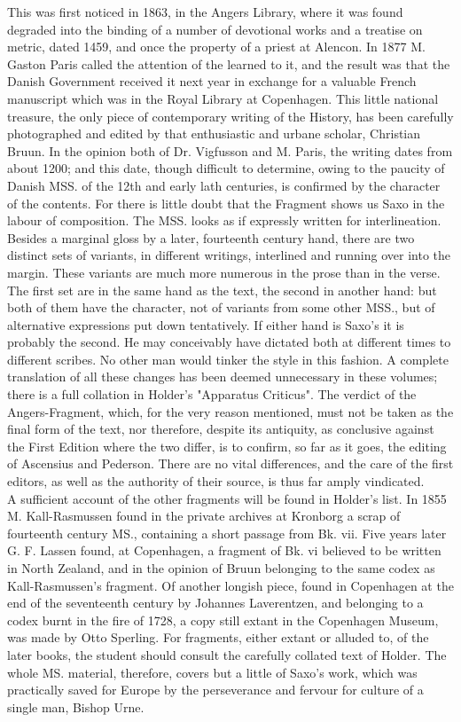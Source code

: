 \documentclass[10pt,a4paper]{report}
\begin{document}
This was first noticed in 1863, in the Angers Library, where it was found degraded into the binding of a number of devotional works and a treatise on metric, dated 1459, and once the property of a priest at Alencon. In 1877 M. Gaston Paris called the attention of the learned to it, and the result was that the Danish Government received it next year in exchange for a valuable French manuscript which was in the Royal Library at Copenhagen. This little national treasure, the only piece of contemporary writing of the History, has been carefully photographed and edited by that enthusiastic and urbane scholar, Christian Bruun. In the opinion both of Dr. Vigfusson and M. Paris, the writing dates from about 1200; and this date, though difficult to determine, owing to the paucity of Danish MSS. of the 12th and early lath centuries, is confirmed by the character of the contents. For there is little doubt that the Fragment shows us Saxo in the labour of composition. The MSS. looks as if expressly written for interlineation. Besides a marginal gloss by a later, fourteenth century hand, there are two distinct sets of variants, in different writings, interlined and running over into the margin. These variants are much more numerous in the prose than in the verse. The first set are in the same hand as the text, the second in another hand: but both of them have the character, not of variants from some other MSS., but of alternative expressions put down tentatively. If either hand is Saxo's it is probably the second. He may conceivably have dictated both at different times to different scribes. No other man would tinker the style in this fashion. A complete translation of all these changes has been deemed unnecessary in these volumes; there is a full collation in Holder's "Apparatus Criticus". The verdict of the Angers-Fragment, which, for the very reason mentioned, must not be taken as the final form of the text, nor therefore, despite its antiquity, as conclusive against the First Edition where the two differ, is to confirm, so far as it goes, the editing of Ascensius and Pederson. There are no vital differences, and the care of the first editors, as well as the authority of their source, is thus far amply vindicated.\\

A sufficient account of the other fragments will be found in Holder's list. In 1855 M. Kall-Rasmussen found in the private archives at Kronborg a scrap of fourteenth century MS., containing a short passage from Bk. vii. Five years later G. F. Lassen found, at Copenhagen, a fragment of Bk. vi believed to be written in North Zealand, and in the opinion of Bruun belonging to the same codex as Kall-Rasmussen's fragment. Of another longish piece, found in Copenhagen at the end of the seventeenth century by Johannes Laverentzen, and belonging to a codex burnt in the fire of 1728, a copy still extant in the Copenhagen Museum, was made by Otto Sperling. For fragments, either extant or alluded to, of the later books, the student should consult the carefully collated text of Holder. The whole MS. material, therefore, covers but a little of Saxo's work, which was practically saved for Europe by the perseverance and fervour for culture of a single man, Bishop Urne.\\
\end{document}

